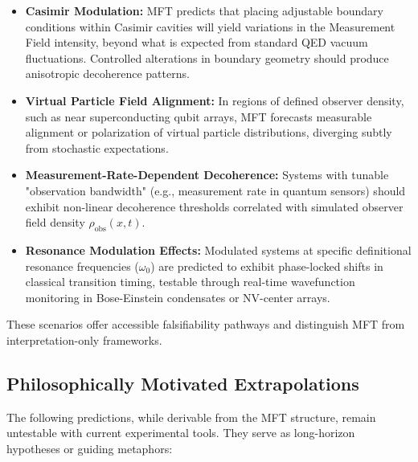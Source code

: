 \begin{itemize}
  \item \textbf{Casimir Modulation:} MFT predicts that placing adjustable boundary conditions within Casimir cavities will yield variations in the Measurement Field intensity, beyond what is expected from standard QED vacuum fluctuations. Controlled alterations in boundary geometry should produce anisotropic decoherence patterns.
  
  \item \textbf{Virtual Particle Field Alignment:} In regions of defined observer density, such as near superconducting qubit arrays, MFT forecasts measurable alignment or polarization of virtual particle distributions, diverging subtly from stochastic expectations.
  
  \item \textbf{Measurement-Rate-Dependent Decoherence:} Systems with tunable "observation bandwidth" (e.g., measurement rate in quantum sensors) should exhibit non-linear decoherence thresholds correlated with simulated observer field density \(\rho_{\text{obs}}(x,t)\).

  \item \textbf{Resonance Modulation Effects:} Modulated systems at specific definitional resonance frequencies (\(\omega_0\)) are predicted to exhibit phase-locked shifts in classical transition timing, testable through real-time wavefunction monitoring in Bose-Einstein condensates or NV-center arrays.
\end{itemize}

These scenarios offer accessible falsifiability pathways and distinguish MFT from interpretation-only frameworks.


\subsection*{Philosophically Motivated Extrapolations}

The following predictions, while derivable from the MFT structure, remain untestable with current experimental tools. They serve as long-horizon hypotheses or guiding metaphors:

